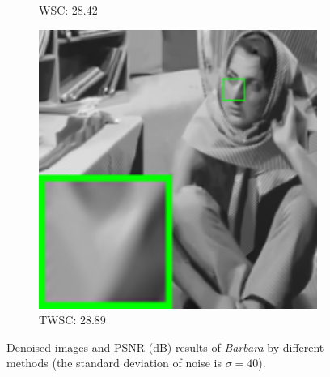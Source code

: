 \begin{figure}
\begin{adjustwidth}{-2cm}{}
\begin{subfigure}[t]{0.19\textwidth}
		\caption{WSC: 28.42}
    \end{subfigure}
    \hfill
    \begin{subfigure}[t]{0.19\textwidth}
        \centering
        \includegraphics[width=1\textwidth]{images/twsc/awgn/resize_br_WLSWSC_40_barbara.png}
		\caption{TWSC: 28.89}
    \end{subfigure}
    \caption{Denoised images and PSNR (dB) results of \textsl{Barbara} by different methods (the standard deviation of noise is $\sigma=40$).}
    \label{fig6}
\end{adjustwidth}
\end{figure}


